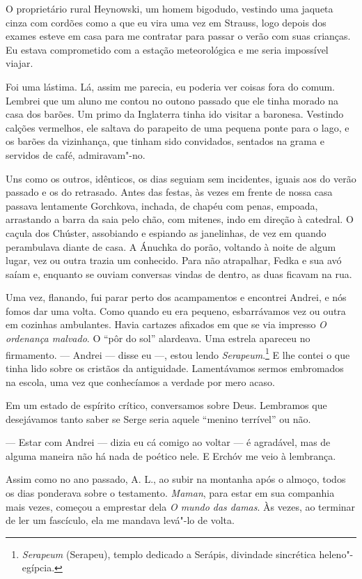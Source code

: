 O proprietário rural Heynowski, um homem bigodudo, vestindo uma jaqueta
cinza com cordões como a que eu vira uma vez em Strauss, logo depois dos
exames esteve em casa para me contratar para passar o verão com suas
crianças. Eu estava comprometido com a estação meteorológica e me seria
impossível viajar.

Foi uma lástima. Lá, assim me parecia, eu poderia ver coisas fora do
comum. Lembrei que um aluno me contou no outono passado que ele tinha
morado na casa dos barões. Um primo da Inglaterra tinha ido visitar a
baronesa. Vestindo calções vermelhos, ele saltava do parapeito de uma
pequena ponte para o lago, e os barões da vizinhança, que tinham sido
convidados, sentados na grama e servidos de café, admiravam"-no.

Uns como os outros, idênticos, os dias seguiam sem incidentes, iguais
aos do verão passado e os do retrasado. Antes das festas, às vezes em
frente de nossa casa passava lentamente Gorchkova, inchada, de chapéu
com penas, empoada, arrastando a barra da saia pelo chão, com mitenes,
indo em direção à catedral. O caçula dos Chúster, assobiando e espiando
as janelinhas, de vez em quando perambulava diante de casa. A Ánuchka do
porão, voltando à noite de algum lugar, vez ou outra trazia um
conhecido. Para não atrapalhar, Fedka e sua avó saíam e, enquanto se
ouviam conversas vindas de dentro, as duas ficavam na rua.

Uma vez, flanando, fui parar perto dos acampamentos e encontrei Andrei,
e nós fomos dar uma volta. Como quando eu era pequeno, esbarrávamos vez
ou outra em cozinhas ambulantes. Havia cartazes afixados em que se via
impresso \emph{O ordenança malvado}. O ``pôr do sol'' alardeava. Uma
estrela apareceu no firmamento. --- Andrei --- disse eu ---, estou lendo
\emph{Serapeum}.\footnote{\emph{Serapeum} (Serapeu), templo dedicado a
  Serápis, divindade sincrética heleno"-egípcia.} E lhe contei o que
tinha lido sobre os cristãos da antiguidade. Lamentávamos sermos %
embromados na escola, uma vez que conhecíamos a verdade por mero acaso.

Em um estado de espírito crítico, conversamos sobre Deus. Lembramos que
desejávamos tanto saber se Serge seria aquele ``menino terrível'' ou
não.

--- Estar com Andrei --- dizia eu cá comigo ao voltar --- é agradável,
mas de alguma maneira não há nada de poético nele. E Erchóv me veio à
lembrança.

Assim como no ano passado, A. L., ao subir na montanha após o almoço,
todos os dias ponderava sobre o testamento. \emph{Maman}, para estar em
sua companhia mais vezes, começou a emprestar dela \emph{O mundo das
damas}. Às vezes, ao terminar de ler um fascículo, ela me mandava
levá"-lo de volta.

